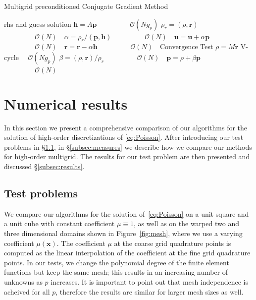 \documentclass[smallcondensed,final]{svjour3}     %
\newcommand{\todo}[1]{\textcolor{red}{ #1}}
\newcommand{\bs}[1]{\ensuremath{\boldsymbol #1}}
\begin{document}
\begin{algorithm}[ht] 
  \caption{Multigrid preconditioned Conjugate Gradient Method} \label{alg:pcg} 
  \begin{algorithmic}[1]
    \Require rhs and guess
    \Ensure  solution
    \State $\bs{h} = A \bs{p}$ 											\Comment $~~\quad\quad\quad\quad\mathcal{O}(Ng_p)$
    \State $\rho_r = (\rho, \bs{r})$								\Comment $~~\quad\quad\quad\quad\mathcal{O}(N)~~~$
    \State $\alpha = \rho_r / ( \bs{p}, \bs{h} )$		\Comment $~~\quad\quad\quad\quad\mathcal{O}(N)~~~$
    \State $\bs{u} = \bs{u} + \alpha\bs{p}$					\Comment $~~\quad\quad\quad\quad\mathcal{O}(N)~~~$
    \State $\bs{r} = \bs{r} - \alpha\bs{h}$					\Comment $~~\quad\quad\quad\quad\mathcal{O}(N)~~~$
    \State Convergence Test
    \State $\rho = M\bs{r}$ 												\Comment V-cycle $\quad\mathcal{O}(Ng_p)$
    \State $\beta = (\rho, \bs{r}) / \rho_r$				\Comment $~~\quad\quad\quad\quad\mathcal{O}(N)~~~$
    \State $\bs{p} = \rho + \beta\bs{p}$						\Comment $~~\quad\quad\quad\quad\mathcal{O}(N)~~~$
    \EndWhile
  \end{algorithmic}
\end{algorithm}




\section{Numerical results}\label{sec:numerics}
In this section we present a comprehensive comparison of our
algorithms for the solution of high-order discretizations of
\eqref{eq:Poisson}.  After introducing our test problems in
\S\ref{subsec:tests}, in \S\ref{subsec:measures} we
describe how we compare our methods for high-order multigrid. The
results for our test problem are then presented and discussed
\S\ref{subsec:results}.


\subsection{Test problems}\label{subsec:tests}
We compare our algorithms for the solution of~\eqref{eq:Poisson} on a
unit square and a unit cube with constant coefficient $\mu\equiv 1$,
as well as on the warped two and three dimensional domains shown in
Figure~\ref{fig:mesh}, where we use a varying coefficient $\mu(\bs
x)$. 
The coefficient $\mu$ at the coarse grid quadrature points is
computed as the linear interpolation of the coefficient at the fine
grid quadrature points. In our tests, we change the polynomial degree of
the finite element functions but keep the same mesh; this results in
an increasing number of unknowns as $p$ increases. It is important to 
point out that mesh independence is acheived for all $p$, therefore
the results are similar for larger mesh sizes as well.
\end{document}
